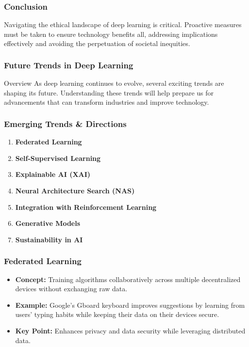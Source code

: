 \documentclass[aspectratio=169]{beamer}
\begin{document}
\begin{frame}[fragile]
    \frametitle{Conclusion}
    Navigating the ethical landscape of deep learning is critical. Proactive measures must be taken to ensure technology benefits all, addressing implications effectively and avoiding the perpetuation of societal inequities.
\end{frame}

\begin{frame}[fragile]
    \frametitle{Future Trends in Deep Learning}
    \begin{block}{Overview}
        As deep learning continues to evolve, several exciting trends are shaping its future. 
        Understanding these trends will help prepare us for advancements that can transform industries and improve technology.
    \end{block}
\end{frame}

\begin{frame}[fragile]
    \frametitle{Emerging Trends \& Directions}
    \begin{enumerate}
        \item \textbf{Federated Learning}
        \item \textbf{Self-Supervised Learning}
        \item \textbf{Explainable AI (XAI)}
        \item \textbf{Neural Architecture Search (NAS)}
        \item \textbf{Integration with Reinforcement Learning}
        \item \textbf{Generative Models}
        \item \textbf{Sustainability in AI}
    \end{enumerate}
\end{frame}

\begin{frame}[fragile]
    \frametitle{Federated Learning}
    \begin{itemize}
        \item \textbf{Concept:} Training algorithms collaboratively across multiple decentralized devices without exchanging raw data.
        \item \textbf{Example:} Google’s Gboard keyboard improves suggestions by learning from users’ typing habits while keeping their data on their devices secure.
        \item \textbf{Key Point:} Enhances privacy and data security while leveraging distributed data.
    \end{itemize}
\end{frame}
\end{document}
